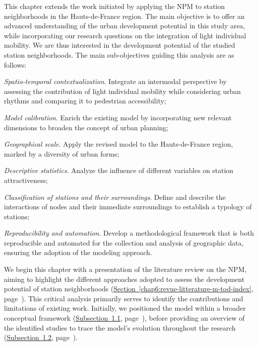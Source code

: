 \begin{refsegment}
This chapter extends the work initiated by applying the \acrshort{NPM} to station neighborhoods in the Hauts-de-France region. The main objective is to offer an advanced understanding of the urban development potential in this study area, while incorporating our research questions on the integration of light individual mobility. We are thus interested in the development potential of the studied station neighborhoods. The main sub-objectives guiding this analysis are as follows:
\begin{customitemize}
    \item \textsl{Spatio-temporal contextualization}. Integrate an intermodal perspective by assessing the contribution of light individual mobility while considering urban rhythms and comparing it to pedestrian accessibility;
    \item \textsl{Model calibration}. Enrich the existing model by incorporating new relevant dimensions to broaden the concept of urban planning;
    \item \textsl{Geographical scale}. Apply the revised model to the Hauts-de-France region, marked by a diversity of urban forms;
    \item \textsl{Descriptive statistics}. Analyze the influence of different variables on station attractiveness;
    \item \textsl{Classification of stations and their surroundings}. Define and describe the interactions of nodes and their immediate surroundings to establish a typology of stations;
    \item \textsl{Reproducibility and automation}. Develop a methodological framework that is both reproducible and automated for the collection and analysis of geographic data, ensuring the adoption of the modeling approach.
\end{customitemize}%

We begin this chapter with a presentation of the literature review on the \acrshort{NPM}, aiming to highlight the different approaches adopted to assess the development potential of station neighborhoods (\hyperref[chap6:revue-litterature-m-tod-index]{Section~\ref{chap6:revue-litterature-m-tod-index}}, page~\pageref{chap6:revue-litterature-m-tod-index}). This critical analysis primarily serves to identify the contributions and limitations of existing work. Initially, we positioned the model within a broader conceptual framework (\hyperref[chap6:litterature-concept]{Subsection~1.1}, page~\pageref{chap6:litterature-concept}), before providing an overview of the identified studies to trace the model's evolution throughout the research (\hyperref[chap6:litterature-etat-art]{Subsection~1.2}, page~\pageref{chap6:litterature-etat-art}).%


\end{refsegment}
